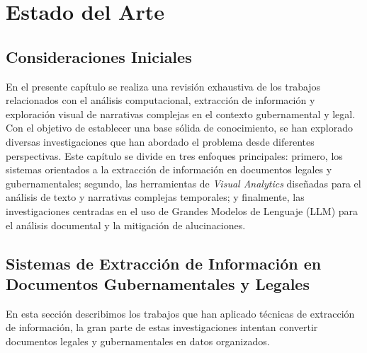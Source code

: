 \chapter{Estado del Arte}
\label{cap:estado_arte}

\section{Consideraciones Iniciales}

En el presente capítulo se realiza una revisión exhaustiva de los trabajos relacionados con el análisis computacional, extracción de información y exploración visual de narrativas complejas en el contexto gubernamental y legal. Con el objetivo de establecer una base sólida de conocimiento, se han explorado diversas investigaciones que han abordado el problema desde diferentes perspectivas. Este capítulo se divide en tres enfoques principales: primero, los sistemas orientados a la extracción de información en documentos legales y gubernamentales; segundo, las herramientas de \textit{Visual Analytics} diseñadas para el análisis de texto y narrativas complejas temporales; y finalmente, las investigaciones centradas en el uso de Grandes Modelos de Lenguaje (\acs{LLM}) para el análisis documental y la mitigación de alucinaciones.

\section{Sistemas de Extracción de Información en Documentos Gubernamentales y Legales}

En esta sección describimos los trabajos que han aplicado técnicas de extracción de información, la gran parte de estas investigaciones intentan convertir documentos legales y gubernamentales en datos organizados.





